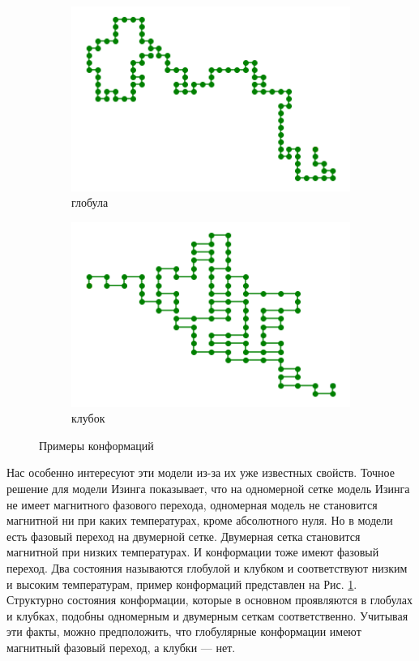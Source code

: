 \begin{figure}[h]
	\centering
    \begin{subfigure}{0.45\textwidth}
        \includegraphics[width=\textwidth]{../images/loose_conf.png}
        \caption{глобула}
    \end{subfigure}
    \begin{subfigure}{0.45\textwidth}
	    \includegraphics[width=\textwidth]{../images/dense_conf.png}
        \caption{клубок}
    \end{subfigure} 
	\caption{Примеры конформаций}
    \label{fig::globule_coil_example}
\end{figure}

Нас особенно интересуют эти модели из-за их уже известных свойств. Точное решение для модели Изинга \cite{ising_solutions} показывает, что на одномерной сетке модель Изинга не имеет магнитного фазового перехода, одномерная модель не становится магнитной ни при каких температурах, кроме абсолютного нуля. Но в модели есть фазовый переход на двумерной сетке. Двумерная сетка становится магнитной при низких температурах. И конформации тоже имеют фазовый переход. Два состояния называются глобулой и клубком и соответствуют низким и высоким температурам, пример конформаций представлен на Рис. \ref{fig::globule_coil_example}. Структурно состояния конформации, которые в основном проявляются в глобулах и клубках, подобны одномерным и двумерным сеткам соответственно. Учитывая эти факты, можно предположить, что глобулярные конформации имеют магнитный фазовый переход, а клубки — нет.

